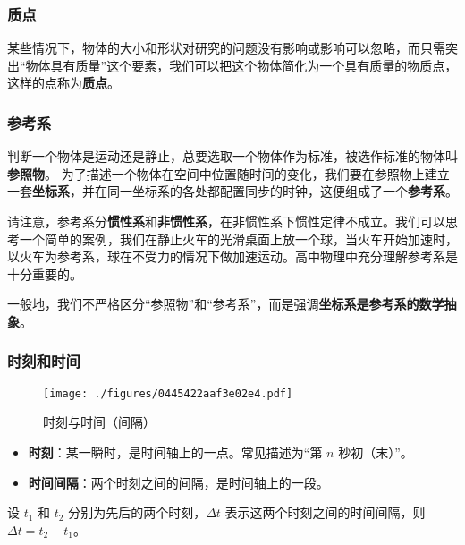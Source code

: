 \subsubsection{质点}
某些情况下，物体的大小和形状对研究的问题没有影响或影响可以忽略，而只需突出“物体具有质量”这个要素，我们可以把这个物体简化为一个具有质量的物质点，这样的点称为\textbf{质点}。

\subsubsection{参考系}
判断一个物体是运动还是静止，总要选取一个物体作为标准，被选作标准的物体叫\textbf{参照物}。
为了描述一个物体在空间中位置随时间的变化，我们要在参照物上建立一套\textbf{坐标系}，并在同一坐标系的各处都配置同步的时钟，这便组成了一个\textbf{参考系}。

请注意，参考系分\textbf{惯性系}和\textbf{非惯性系}，在非惯性系下惯性定律不成立。我们可以思考一个简单的案例，我们在静止火车的光滑桌面上放一个球，当火车开始加速时，以火车为参考系，球在不受力的情况下做加速运动。高中物理中充分理解参考系是十分重要的。

一般地，我们不严格区分“参照物”和“参考系”，而是强调\textbf{坐标系是参考系的数学抽象}。

\subsubsection{时刻和时间}
\begin{figure}[ht]
\centering
\texttt{[image: ./figures/0445422aaf3e02e4.pdf]}
\caption{时刻与时间（间隔）} \label{fig_HSPM01_2}
\end{figure}
\begin{itemize}
\item \textbf{时刻}：某一瞬时，是时间轴上的一点。常见描述为“第 $n$ 秒初（末）”。
\item \textbf{时间间隔}：两个时刻之间的间隔，是时间轴上的一段。
\end{itemize}

设 $t_1$ 和 $t_2$ 分别为先后的两个时刻，$\Delta t$ 表示这两个时刻之间的时间间隔，则 $\Delta t = t_2 - t_1$。

